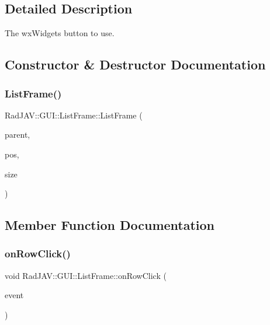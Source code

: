 \subsection{Detailed Description}
The wx\+Widgets button to use. 

\subsection{Constructor \& Destructor Documentation}
\mbox{\label{class_rad_j_a_v_1_1_g_u_i_1_1_list_frame_a21e140af7f551a97e48fda6a2b0dcd63}} 
\subsubsection{\texorpdfstring{List\+Frame()}{ListFrame()}}
{\footnotesize\ttfamily Rad\+J\+A\+V\+::\+G\+U\+I\+::\+List\+Frame\+::\+List\+Frame (\begin{DoxyParamCaption}\item[{wx\+Window $\ast$}]{parent,  }\item[{const wx\+Point \&}]{pos,  }\item[{const wx\+Size \&}]{size }\end{DoxyParamCaption})}



\subsection{Member Function Documentation}
\mbox{\label{class_rad_j_a_v_1_1_g_u_i_1_1_list_frame_a3a93f46babd9e2ad84aeb8ba6a703d09}} 
\subsubsection{\texorpdfstring{on\+Row\+Click()}{onRowClick()}}
{\footnotesize\ttfamily void Rad\+J\+A\+V\+::\+G\+U\+I\+::\+List\+Frame\+::on\+Row\+Click (\begin{DoxyParamCaption}\item[{wx\+List\+Event \&}]{event }\end{DoxyParamCaption})}

